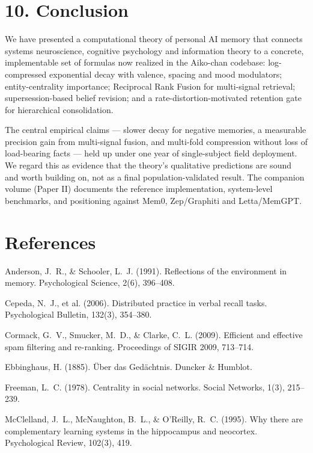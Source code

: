 \documentclass[]{article}
\begin{document}
\hypertarget{conclusion}{%
\section{\texorpdfstring{\textbf{10.
Conclusion}}{10. Conclusion}}\label{conclusion}}

We have presented a computational theory of personal AI memory that
connects systems neuroscience, cognitive psychology and information theory
to a concrete, implementable set of formulas now realized in the Aiko-chan
codebase: log-compressed exponential decay with valence, spacing and mood
modulators; entity-centrality importance; Reciprocal Rank Fusion for
multi-signal retrieval; supersession-based belief revision; and a
rate-distortion-motivated retention gate for hierarchical consolidation.

The central empirical claims --- slower decay for negative memories, a
measurable precision gain from multi-signal fusion, and multi-fold
compression without loss of load-bearing facts --- held up under one year of
single-subject field deployment. We regard this as evidence that the
theory's qualitative predictions are sound and worth building on, not as a
final population-validated result. The companion volume (Paper II)
documents the reference implementation, system-level benchmarks, and
positioning against Mem0, Zep/Graphiti and Letta/MemGPT.

\hypertarget{references}{%
\section{\texorpdfstring{\textbf{References}}{References}}\label{references}}

Anderson, J.\ R., \& Schooler, L.\ J. (1991). Reflections of the
environment in memory. Psychological Science, 2(6), 396--408.

Cepeda, N.\ J., et al. (2006). Distributed practice in verbal recall tasks.
Psychological Bulletin, 132(3), 354--380.

Cormack, G.\ V., Smucker, M.\ D., \& Clarke, C.\ L. (2009). Efficient and
effective spam filtering and re-ranking. Proceedings of SIGIR 2009,
713--714.

Ebbinghaus, H. (1885). Über das Gedächtnis. Duncker \& Humblot.

Freeman, L.\ C. (1978). Centrality in social networks. Social Networks,
1(3), 215--239.

McClelland, J.\ L., McNaughton, B.\ L., \& O'Reilly, R.\ C. (1995). Why there
are complementary learning systems in the hippocampus and neocortex.
Psychological Review, 102(3), 419.
\end{document}
